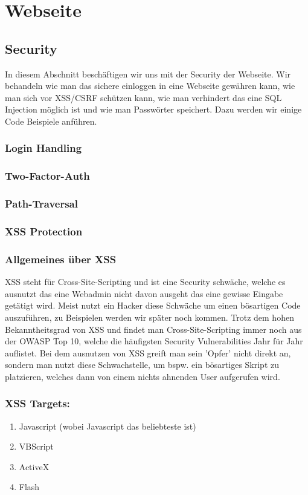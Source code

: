 
\section{Webseite}
\label{sec:Webseite}
\subsection{Security}
\label{sec:Security}
In diesem Abschnitt beschäftigen wir uns mit der Security der Webseite.
Wir behandeln wie man das sichere einloggen in eine Webseite gewähren kann, 
wie man sich vor XSS/CSRF schützen kann, wie man verhindert das eine SQL Injection
möglich ist und wie man Passwörter speichert. Dazu werden wir einige Code Beispiele anführen.

\subsubsection{Login Handling}
\label{sec:Login}
\subsubsection{Two-Factor-Auth}
\label{sec:tfa}
\subsubsection{Path-Traversal}
\label{sec:Path-Traversal}
\subsubsection{XSS Protection}
\label{sec:xss}
\subsubsection{Allgemeines über XSS}
XSS steht für Cross-Site-Scripting und ist eine Security schwäche, welche es ausnutzt das eine Webadmin nicht davon ausgeht das eine gewisse Eingabe getätigt wird. Meist nutzt ein Hacker diese Schwäche um einen bösartigen Code auszuführen, zu Beispielen werden wir später noch kommen. Trotz dem hohen Bekanntheitsgrad von XSS und findet man Cross-Site-Scripting immer noch aus der OWASP Top 10, welche die häufigsten Security Vulnerabilities Jahr für Jahr auflistet. Bei dem ausnutzen von XSS greift man sein 'Opfer' nicht direkt an, sondern man nutzt diese Schwachstelle, um bspw. ein bösartiges Skript zu platzieren, welches dann von einem nichts ahnenden User aufgerufen wird. 
\subsubsection{XSS Targets:}
\begin{enumerate}
\item Javascript (wobei Javascript das beliebteste ist) 
\item VBScript 
\item ActiveX
\item Flash
\end{enumerate}
